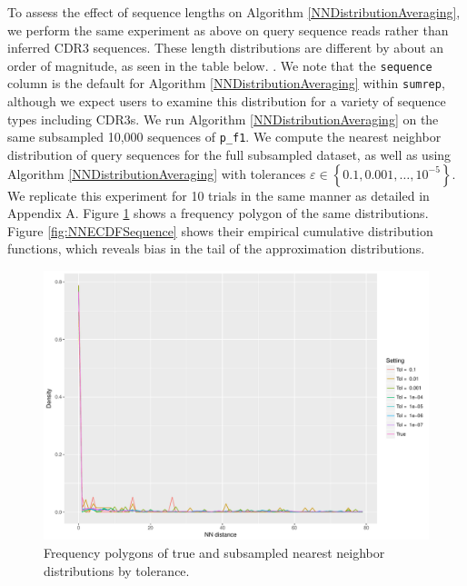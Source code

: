 \documentclass{article}
\begin{document}
To assess the effect of sequence lengths on Algorithm \ref{NNDistributionAveraging}, we perform the same experiment as above on query sequence reads rather than inferred CDR3 sequences.
These length distributions are different by about an order of magnitude, as seen in the table below.
.
We note that the \texttt{sequence} column is the default for Algorithm \ref{NNDistributionAveraging} within \texttt{sumrep}, although we expect users to examine this distribution for a variety of sequence types including CDR3s.
We run Algorithm \ref{NNDistributionAveraging} on the same subsampled 10,000 sequences of \texttt{p\_f1}.
We compute the nearest neighbor distribution of query sequences for the full subsampled dataset, as well as using Algorithm \ref{NNDistributionAveraging} with tolerances $\varepsilon \in \left\{0.1, 0.001, \dotsc, 10^{-5} \right\}$.
We replicate this experiment for 10 trials in the same manner as detailed in Appendix A.
Figure \ref{fig:NNFreqPolySequence} shows a frequency polygon of the same distributions.
Figure \ref{fig:NNECDFSequence} shows their empirical cumulative distribution functions, which reveals bias in the tail of the approximation distributions.
\begin{figure}
    \includegraphics[width=\linewidth]{Figures/NearestNeighbor/Sequence/freqpoly_by_tol.pdf}
    \caption{Frequency polygons of true and subsampled nearest neighbor distributions by tolerance.}
    \label{fig:NNFreqPolySequence}
\end{figure}
\end{document}
